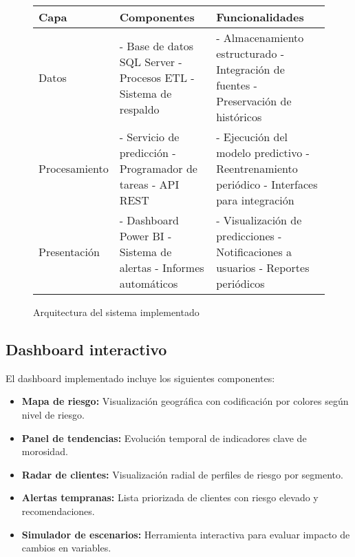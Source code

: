 \begin{figure}[ht]
\centering
\begin{tabular}{|p{3cm}|p{3cm}|p{8cm}|}
\hline
\textbf{Capa} & \textbf{Componentes} & \textbf{Funcionalidades} \\
\hline
Datos & - Base de datos SQL Server \newline - Procesos ETL \newline - Sistema de respaldo & - Almacenamiento estructurado \newline - Integración de fuentes \newline - Preservación de históricos \\
\hline
Procesamiento & - Servicio de predicción \newline - Programador de tareas \newline - API REST & - Ejecución del modelo predictivo \newline - Reentrenamiento periódico \newline - Interfaces para integración \\
\hline
Presentación & - Dashboard Power BI \newline - Sistema de alertas \newline - Informes automáticos & - Visualización de predicciones \newline - Notificaciones a usuarios \newline - Reportes periódicos \\
\hline
\end{tabular}
\caption{Arquitectura del sistema implementado}
\end{figure}

\subsection{Dashboard interactivo}
El dashboard implementado incluye los siguientes componentes:

\begin{itemize}
    \item \textbf{Mapa de riesgo:} Visualización geográfica con codificación por colores según nivel de riesgo.
    
    \item \textbf{Panel de tendencias:} Evolución temporal de indicadores clave de morosidad.
    
    \item \textbf{Radar de clientes:} Visualización radial de perfiles de riesgo por segmento.
    
    \item \textbf{Alertas tempranas:} Lista priorizada de clientes con riesgo elevado y recomendaciones.
    
    \item \textbf{Simulador de escenarios:} Herramienta interactiva para evaluar impacto de cambios en variables.
\end{itemize}

